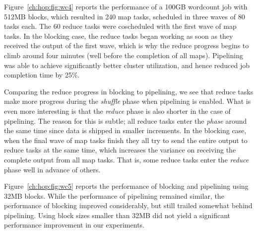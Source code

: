 Figure~\ref{ch:hop:fig:wc4} reports the performance of a 100GB wordcount job
with 512MB blocks, which resulted in 240 map tasks, scheduled in three waves of
80 tasks each.  The 60 reduce tasks were coscheduled with the first wave of map
tasks.  In the blocking case, the reduce tasks began working as soon as they
received the output of the first wave, which is why the reduce progress begins
to climb around four minutes (well before the completion of all maps).
Pipelining was able to achieve significantly better cluster utilization, and
hence reduced job completion time by \texttildelow{}25\%.

Comparing the reduce progress in blocking to pipelining, we see that reduce
tasks make more progress during the {\em shuffle} phase when pipelining is
enabled. What is even more interesting is that the {\em reduce} phase is also
shorter in the case of pipelining. The reason for this is subtle; all reduce
tasks enter the {\em phase} around the same time since data is shipped in
smaller increments. In the blocking case, when the final wave of map tasks
finish they all try to send the entire output to reduce tasks at the same time,
which increases the variance on receiving the complete output from all map
tasks. That is, some reduce tasks enter the {\em reduce} phase well in advance
of others.

Figure~\ref{ch:hop:fig:wc5} reports the performance of blocking and pipelining
using 32MB blocks.  While the performance of pipelining remained similar, the
performance of blocking improved considerably, but still trailed somewhat
behind pipelining.  Using block sizes smaller than 32MB did not yield a
significant performance improvement in our experiments.




